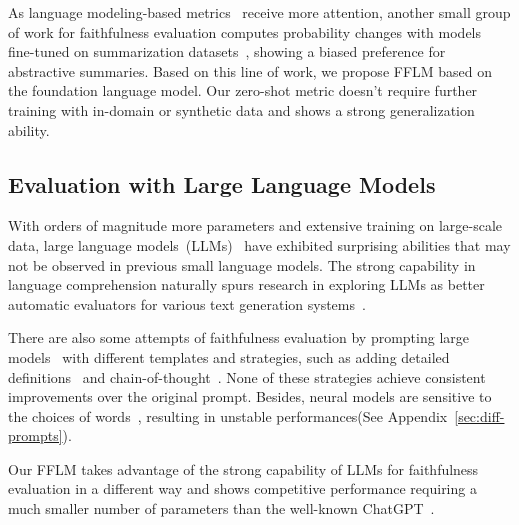 As language modeling-based metrics~\cite{egan2022play,Liu0Z22Ref} receive more attention, another small group of work for faithfulness evaluation computes probability changes with models fine-tuned on summarization datasets~\cite{she2022cop, son2022harim,xie2021factual}, showing a biased preference for abstractive summaries. Based on this line of work, we propose FFLM based on the foundation language model. Our zero-shot metric doesn't require further training with in-domain or synthetic data and shows a strong generalization ability.

\subsection{Evaluation with Large Language Models}

With orders of magnitude more parameters and extensive training on large-scale 
data, large language models~(LLMs)~\cite{gpt3,touvron2023llama} have exhibited 
surprising abilities that may not be observed in previous small language 
models. 
The strong capability in language comprehension naturally spurs research in exploring LLMs as better automatic evaluators for various text generation systems~\cite{wang2023chatgpt}.

There are also some attempts of faithfulness evaluation by prompting large models~\cite{luo2023chatgpt} with different templates and strategies, such as adding detailed definitions~\cite{gao2023human} and chain-of-thought~\cite{chen2023evaluating}. None of these strategies achieve consistent improvements over the original prompt. Besides, neural models are sensitive to the choices of words~\cite{chen2023evaluating}, resulting in unstable performances(See Appendix~\ref{sec:diff-prompts}).

Our FFLM takes advantage of the strong capability of LLMs for faithfulness evaluation in a different way and shows competitive performance requiring a much smaller number of parameters than the well-known ChatGPT~\cite{openai2022}.



